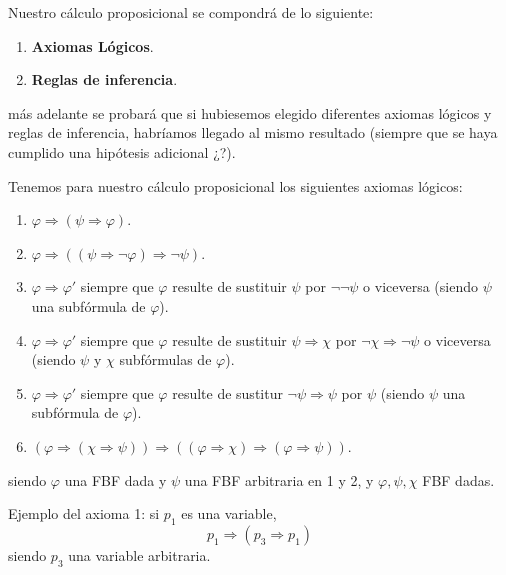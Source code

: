 \documentclass[12pt]{report}
\newcounter{it}
\theoremstyle{largebreak}
\begin{document}
    Nuestro cálculo proposicional se compondrá de lo siguiente:
    \begin{enumerate}
        \item \textbf{Axiomas Lógicos}.
        \item \textbf{Reglas de inferencia}.
    \end{enumerate}
    más adelante se probará que si hubiesemos elegido diferentes axiomas lógicos y reglas de inferencia, habríamos llegado al mismo resultado (siempre que se haya cumplido una hipótesis adicional ¿?). 

    \begin{mydef}
        Tenemos para nuestro cálculo proposicional los siguientes axiomas lógicos:
        \begin{enumerate}
            \item $\varphi\Rightarrow(\psi\Rightarrow\varphi)$.
            \item $\varphi\Rightarrow((\psi\Rightarrow\neg\varphi)\Rightarrow\neg\psi)$.
            \item $\varphi\Rightarrow\varphi'$ siempre que $\varphi$ resulte de sustituir $\psi$ por $\neg\neg\psi$ o viceversa (siendo $\psi$ una subfórmula de $\varphi$).
            \item $\varphi\Rightarrow\varphi'$ siempre que $\varphi$ resulte de sustituir $\psi\Rightarrow\chi$ por $\neg\chi\Rightarrow\neg\psi$ o viceversa (siendo $\psi$ y $\chi$ subfórmulas de $\varphi$).
            \item $\varphi\Rightarrow\varphi'$ siempre que $\varphi$ resulte de sustitur $\neg\psi\Rightarrow\psi$ por $\psi$ (siendo $\psi$ una subfórmula de $\varphi$).
            \item $(\varphi\Rightarrow(\chi\Rightarrow\psi))\Rightarrow((\varphi\Rightarrow\chi)\Rightarrow(\varphi\Rightarrow\psi))$.
        \end{enumerate}
        siendo $\varphi$ una FBF dada y $\psi$ una FBF arbitraria en 1 y 2, y $\varphi,\psi,\chi$ FBF dadas.
    \end{mydef}

    \begin{exa}
        Ejemplo del axioma 1: si $p_1$ es una variable,
        \begin{equation*}
            p_1\Rightarrow(p_3\Rightarrow p_1)
        \end{equation*}
        siendo $p_3$ una variable arbitraria.
    \end{exa}
\end{document}
